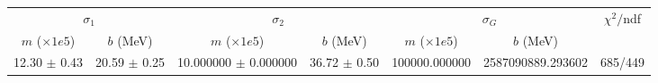 \begin{tabular}{cc|cc|cc||c}
\multicolumn{2}{c|}{$\sigma_1$} & \multicolumn{2}{|c}{$\sigma_2$} & \multicolumn{2}{|c}{$\sigma_G$}  & \multirow{2}{*}{$\chi^2/$ndf}\\
$m$ ($\times1e5$) & $b$ (MeV) & $m$ ($\times1e5$) & $b$ (MeV) & $m$ ($\times1e5$) & $b$ (MeV) & \\
\hline
12.30 $\pm$ 0.43 & 20.59 $\pm$ 0.25 & 10.000000 $\pm$ 0.000000 & 36.72 $\pm$ 0.50 & 100000.000000 & 2587090889.293602 & 685/449\\
\end{tabular}

